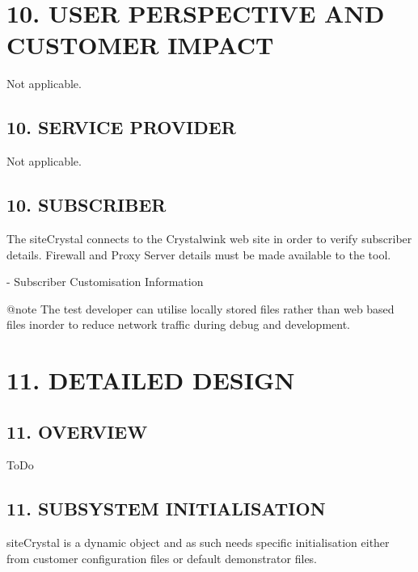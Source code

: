 \hypertarget{index_sec_10}{}\section{10.	\+U\+S\+E\+R P\+E\+R\+S\+P\+E\+C\+T\+I\+V\+E A\+N\+D C\+U\+S\+T\+O\+M\+E\+R I\+M\+P\+A\+C\+T}\label{index_sec_10}
\begin{DoxyVerb}Not applicable.
\end{DoxyVerb}
\hypertarget{index_sec_10_1}{}\subsection{10.	\+S\+E\+R\+V\+I\+C\+E P\+R\+O\+V\+I\+D\+E\+R}\label{index_sec_10_1}
\begin{DoxyVerb}Not applicable.
\end{DoxyVerb}
\hypertarget{index_sec_10_2}{}\subsection{10.	\+S\+U\+B\+S\+C\+R\+I\+B\+E\+R}\label{index_sec_10_2}
\begin{DoxyVerb}The siteCrystal connects to the Crystalwink web site in order to verify subscriber details.  Firewall and Proxy Server details must be made available to the tool.

    - Subscriber Customisation Information

@note The test developer can utilise locally stored files rather than web based files inorder to reduce network traffic during debug and development.
\end{DoxyVerb}
\hypertarget{index_sec_11}{}\section{11.	\+D\+E\+T\+A\+I\+L\+E\+D D\+E\+S\+I\+G\+N}\label{index_sec_11}
\hypertarget{index_sec_11_1}{}\subsection{11.	\+O\+V\+E\+R\+V\+I\+E\+W}\label{index_sec_11_1}
\begin{DoxyVerb}ToDo
\end{DoxyVerb}
\hypertarget{index_sec_11_2}{}\subsection{11.	\+S\+U\+B\+S\+Y\+S\+T\+E\+M I\+N\+I\+T\+I\+A\+L\+I\+S\+A\+T\+I\+O\+N}\label{index_sec_11_2}
\begin{DoxyVerb}siteCrystal is a dynamic object and as such needs specific initialisation either from customer configuration files or default demonstrator files.
\end{DoxyVerb}
